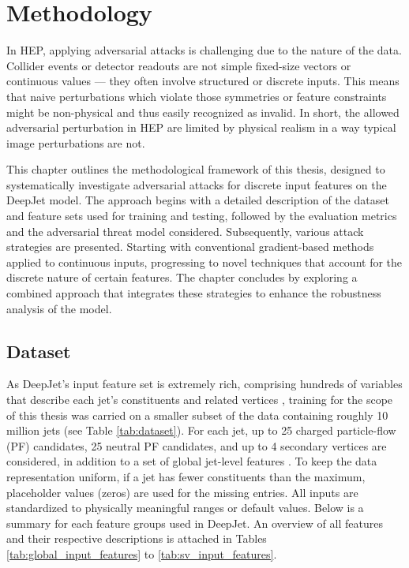 
\chapter{Methodology}

In HEP, applying adversarial attacks is challenging due to the nature of the data. Collider events or detector readouts are not simple fixed-size vectors or continuous values — they often involve structured or discrete inputs. This means that naive perturbations which violate those symmetries or feature constraints might be non-physical and thus easily recognized as invalid. In short, the allowed adversarial perturbation in HEP are limited by physical realism in a way typical image perturbations are not.

This chapter outlines the methodological framework of this thesis, designed to systematically investigate adversarial attacks for discrete input features on the DeepJet model. The approach begins with a detailed description of the dataset and feature sets used for training and testing, followed by the evaluation metrics and the adversarial threat model considered. Subsequently, various attack strategies are presented. Starting with conventional gradient-based methods applied to continuous inputs, progressing to novel techniques that account for the discrete nature of certain features. The chapter concludes by exploring a combined approach that integrates these strategies to enhance the robustness analysis of the model.


\section{Dataset}
\label{sec:dataset}

As DeepJet’s input feature set is extremely rich, comprising hundreds of variables that describe each jet’s constituents and related vertices \cite{Bols_2020}, training for the scope of this thesis was carried on a smaller subset of the data containing roughly 10 million jets (see Table \ref{tab:dataset}). For each jet, up to 25 charged particle-flow (PF) candidates, 25 neutral PF candidates, and up to 4 secondary vertices are considered, in addition to a set of global jet-level features \cite{Bols_2020}. To keep the data representation uniform, if a jet has fewer constituents than the maximum, placeholder values (zeros) are used for the missing entries. All inputs are standardized to physically meaningful ranges or default values. Below is a
summary for each feature groups used in DeepJet. An overview of all features and their respective descriptions is attached in Tables \ref{tab:global_input_features} to \ref{tab:sv_input_features}.



